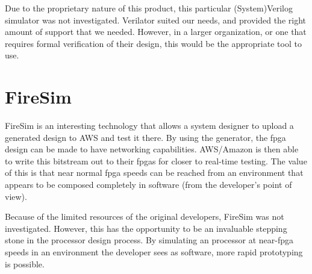 Due to the proprietary nature of this product, this particular (System)Verilog simulator was not investigated.
Verilator suited our needs, and provided the right amount of support that we needed.
However, in a larger organization, or one that requires formal verification of their design, this would be the appropriate tool to use.

\section{FireSim}\label{sec:FireSim_Simulator}
\nocite{firesimPresentation}
FireSim is an interesting technology that allows a system designer to upload a generated design to AWS and test it there.
By using the  generator, the \gls{fpga} design can be made to have networking capabilities.
AWS/Amazon is then able to write this bitstream out to their \glspl{fpga} for closer to real-time testing.
The value of this is that near normal \gls{fpga} speeds can be reached from an environment that appears to be composed completely in software (from the developer's point of view).

Because of the limited resources of the original developers, FireSim was not investigated.
However, this has the opportunity to be an invaluable stepping stone in the processor design process.
By simulating an processor at near-\gls{fpga} speeds in an environment the developer sees as software, more rapid prototyping is possible.

